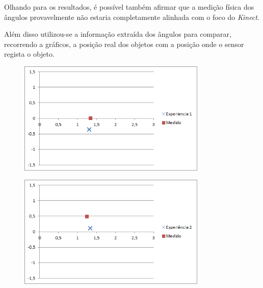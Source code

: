 Olhando para os resultados, é possível também afirmar que a medição física dos ângulos provavelmente não estaria completamente alinhada com o foco do \emph{Kinect}.


Além disso utilizou-se a informação extraída dos ângulos para comparar, recorrendo a gráficos, a posição real dos objetos com a posição onde o sensor regista o objeto.

\begin{figure}
\begin{center}
	\includegraphics[width=0.80\textwidth]{figures/experiencia/pos_chart_exp1.png}
	\label{fig:pos_chart_exp1}
\end{center}
\end{figure}

\begin{figure}
\begin{center}
	\includegraphics[width=0.80\textwidth]{figures/experiencia/pos_chart_exp2.png}
	\label{fig:pos_chart_exp2}
\end{center}
\end{figure}

